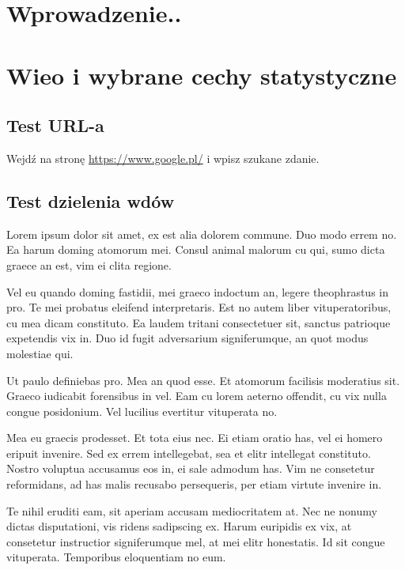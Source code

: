 \chapter{Wprowadzenie..}

\chapter{Wieo i wybrane cechy statystyczne}

\section{Test URL-a}

Wejdź na stronę \url{https://www.google.pl/} i wpisz szukane zdanie.

\clearpage

\section{Test dzielenia wdów}

Lorem ipsum dolor sit amet, ex est alia dolorem commune. Duo modo errem no. Ea harum doming atomorum mei. Consul animal malorum cu qui, sumo dicta graece an est, vim ei clita regione.

Vel eu quando doming fastidii, mei graeco indoctum an, legere theophrastus in pro. Te mei probatus eleifend interpretaris. Est no autem liber vituperatoribus, cu mea dicam constituto. Ea laudem tritani consectetuer sit, sanctus patrioque expetendis vix in. Duo id fugit adversarium signiferumque, an quot modus molestiae qui.

Ut paulo definiebas pro. Mea an quod esse. Et atomorum facilisis moderatius sit. Graeco iudicabit forensibus in vel. Eam cu lorem aeterno offendit, cu vix nulla congue posidonium. Vel lucilius evertitur vituperata no.

Mea eu graecis prodesset. Et tota eius nec. Ei etiam oratio has, vel ei homero eripuit invenire. Sed ex errem intellegebat, sea et elitr intellegat constituto. Nostro voluptua accusamus eos in, ei sale admodum has. Vim ne consetetur reformidans, ad has malis recusabo persequeris, per etiam virtute invenire in.

Te nihil eruditi eam, sit aperiam accusam mediocritatem at. Nec ne nonumy dictas disputationi, vis ridens sadipscing ex. Harum euripidis ex vix, at consetetur instructior signiferumque mel, at mei elitr honestatis. Id sit congue vituperata. Temporibus eloquentiam no eum.


